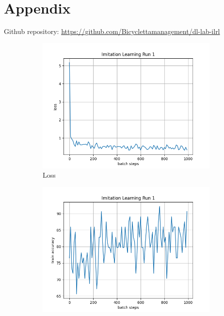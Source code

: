 \documentclass[10pt]{scrartcl}
\begin{document}
\section*{Appendix}
Github repository: \url{https://github.com/Bicyclettamanagement/dl-lab-ilrl}\\
\begin{figure}[h]
\begin{subfigure}{0.5\textwidth}
  \centering
  \includegraphics[width=\linewidth]{images/Il1_loss.png}
  \caption{Loss}
  \label{fig:Il1_loss}
\end{subfigure} 
\begin{subfigure}{0.5\textwidth}
  \centering
  \includegraphics[width=\linewidth]{images/Il1_train.png}

\end{subfigure}
\end{figure}
\end{document}
